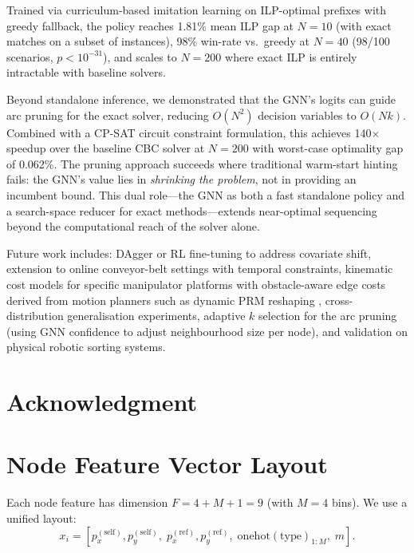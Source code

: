 \documentclass[conference]{IEEEtran}
\begin{document}
Trained via curriculum-based imitation learning on ILP-optimal prefixes with greedy fallback, the policy reaches 1.81\% mean ILP gap at $N{=}10$ (with exact matches on a subset of instances), 98\% win-rate vs.\ greedy at $N{=}40$ (98/100 scenarios, $p < 10^{-31}$), and scales to $N{=}200$ where exact ILP is entirely intractable with baseline solvers.

Beyond standalone inference, we demonstrated that the GNN's logits can guide arc pruning for the exact solver, reducing $O(N^2)$ decision variables to $O(Nk)$. Combined with a CP-SAT circuit constraint formulation, this achieves 140$\times$ speedup over the baseline CBC solver at $N{=}200$ with worst-case optimality gap of 0.062\%. The pruning approach succeeds where traditional warm-start hinting fails: the GNN's value lies in \emph{shrinking the problem}, not in providing an incumbent bound. This dual role---the GNN as both a fast standalone policy and a search-space reducer for exact methods---extends near-optimal sequencing beyond the computational reach of the solver alone.

Future work includes: DAgger or RL fine-tuning to address covariate shift, extension to online conveyor-belt settings with temporal constraints, kinematic cost models for specific manipulator platforms \cite{han2019pap} with obstacle-aware edge costs derived from motion planners such as dynamic PRM reshaping \cite{ojha2025obstacle}, cross-distribution generalisation experiments, adaptive $k$ selection for the arc pruning (using GNN confidence to adjust neighbourhood size per node), and validation on physical robotic sorting systems.

\section*{Acknowledgment}

\appendices
\section{Node Feature Vector Layout}\label{app:features}

Each node feature has dimension $F = 4 + M + 1 = 9$ (with $M{=}4$ bins). We use a unified layout:
\begin{equation}
x_i = [p^{(\text{self})}_x, p^{(\text{self})}_y,\; p^{(\text{ref})}_x, p^{(\text{ref})}_y,\; \text{onehot}(\text{type})_{1:M},\; m].
\end{equation}
\end{document}
